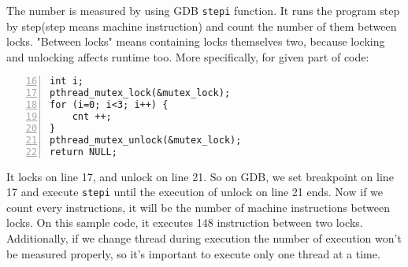 The number is measured by using GDB \verb|stepi| function. It runs the program step by step(step means machine instruction) and count the number of them between locks. "Between locks" means containing locks themselves two, because locking and unlocking affects runtime too. More specifically, for given part of code:

\begin{lstlisting}[frame=tb, xleftmargin=2em, framexleftmargin=1.5em, numbers=left, firstnumber=16]
int i;
pthread_mutex_lock(&mutex_lock);
for (i=0; i<3; i++) {
    cnt ++;
}
pthread_mutex_unlock(&mutex_lock);
return NULL;
\end{lstlisting}

It locks on line 17, and unlock on line 21. So on GDB, we set breakpoint on line 17 and execute \verb|stepi| until the execution of unlock on line 21 ends. Now if we count every instructions, it will be the number of machine instructions between locks. On this sample code, it executes 148 instruction between two locks. Additionally, if we change thread during execution the number of execution won't be measured properly, so it's important to execute only one thread at a time.
